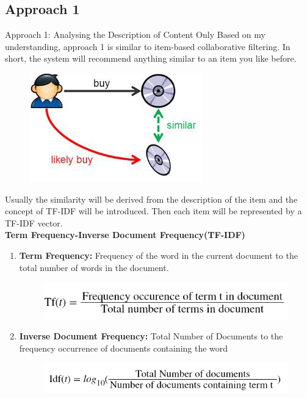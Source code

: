 \subsection{Approach 1}
\begin{frame}{Approach 1: Analysing the Description of Content Only}
    Based on my understanding, approach 1 is similar to item-based collaborative filtering. In short, the system will recommend anything similar to an item you like before.
    \begin{figure}
        \centering
        \includegraphics[scale=0.5]{figures/content-based-1.png}
    \end{figure}
    \newpage
    Usually the similarity will be derived from the description of the item and the concept of TF-IDF will be introduced. Then each item will be represented by a TF-IDF vector.\\
    \newline
    \textbf{Term Frequency-Inverse Document Frequency(TF-IDF)}
    \begin{enumerate}
        \item \textbf{Term Frequency:} Frequency of the word in the current document to the total number of words in the document.
        \begin{figure}
            \includegraphics[scale=0.6]{figures/tf.PNG}
        \end{figure}
        \item \textbf{Inverse Document Frequency:} Total Number of Documents to the frequency occurrence of documents containing the word
        \begin{figure}
            \includegraphics[scale=0.6]{figures/idtf.PNG}

\end{figure}
\end{enumerate}
\end{frame}
